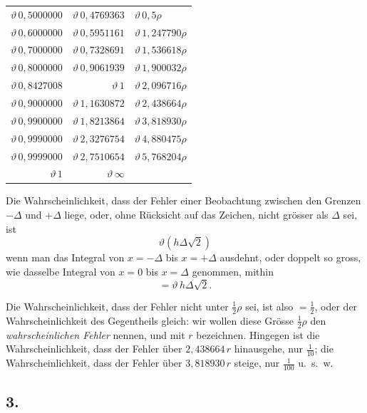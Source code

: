 \documentclass[12pt,a4paper]{article}
\begin{document}
\begin{center}
\begin{tabular}{r@{\quad$=$\quad}r@{\quad$=$\quad}l}
$\vartheta\,0{,}5000000$ & $\vartheta\,0{,}4769363$ & $\vartheta\,0{,}5\rho$ \\
$\vartheta\,0{,}6000000$ & $\vartheta\,0{,}5951161$ & $\vartheta\,1{,}247790\rho$ \\
$\vartheta\,0{,}7000000$ & $\vartheta\,0{,}7328691$ & $\vartheta\,1{,}536618\rho$ \\
$\vartheta\,0{,}8000000$ & $\vartheta\,0{,}9061939$ & $\vartheta\,1{,}900032\rho$ \\
$\vartheta\,0{,}8427008$ & $\vartheta\,1$ & $\vartheta\,2{,}096716\rho$ \\
$\vartheta\,0{,}9000000$ & $\vartheta\,1{,}1630872$ & $\vartheta\,2{,}438664\rho$ \\
$\vartheta\,0{,}9900000$ & $\vartheta\,1{,}8213864$ & $\vartheta\,3{,}818930\rho$ \\
$\vartheta\,0{,}9990000$ & $\vartheta\,2{,}3276754$ & $\vartheta\,4{,}880475\rho$ \\
$\vartheta\,0{,}9999000$ & $\vartheta\,2{,}7510654$ & $\vartheta\,5{,}768204\rho$ \\
$\vartheta\,1$ & $\vartheta\,\infty$ &
\end{tabular}
\end{center}

Die Wahrscheinlichkeit, dass der Fehler einer Beobachtung zwischen den Grenzen $-\Delta$ und $+\Delta$ liege, oder, ohne R\"ucksicht auf das Zeichen, nicht gr\"osser als $\Delta$ sei, ist
\[
\vartheta(h\Delta\sqrt{2})
\]
wenn man das Integral von $x = -\Delta$ bis $x = +\Delta$ ausdehnt, oder doppelt so gross, wie dasselbe Integral von $x = 0$ bis $x = \Delta$ genommen, mithin
\[
= \vartheta\,h\Delta\sqrt{2}.
\]

Die Wahrscheinlichkeit, dass der Fehler nicht unter $\frac{1}{2}\rho$ sei, ist also $= \frac{1}{2}$, oder der Wahrscheinlichkeit des Gegentheils gleich: wir wollen diese Gr\"osse $\frac{1}{2}\rho$ den \textit{wahrscheinlichen Fehler} nennen, und mit $r$ bezeichnen. Hingegen ist die Wahrscheinlichkeit, dass der Fehler \"uber $2{,}438664\,r$ hinausgehe, nur $\frac{1}{10}$; die Wahrscheinlichkeit, dass der Fehler \"uber $3{,}818930\,r$ steige, nur $\frac{1}{100}$ u.\ s.\ w.

\subsection*{3.}
\end{document}
